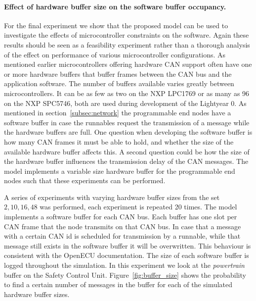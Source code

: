 \paragraph{Effect of hardware buffer size on the software buffer occupancy.} For the final experiment we show that the proposed model can be used to investigate the effects of microcontroller constraints on the software. Again these results should be seen as a feasibility experiment rather than a thorough analysis of the effect on performance of various microcontroller configurations. As mentioned earlier microcontrollers offering hardware CAN support often have one or more hardware buffers that buffer frames between the CAN bus and the application software. The number of buffers available varies greatly between microcontrollers. It can be as few as two on the NXP LPC1769 or as many as 96 on the NXP SPC5746, both are used during development of the Lightyear 0. As mentioned in section~\ref{subsec:network} the programmable end nodes have a software buffer in case the runnables request the transmission of a message while the hardware buffers are full. One question when developing the software buffer is how many CAN frames it must be able to hold, and whether the size of the available hardware buffer affects this. A second question could be how the size of the hardware buffer influences the transmission delay of the CAN messages. The model implements a variable size hardware buffer for the programmable end nodes such that these experiments can be performed. 

A series of experiments with varying hardware buffer sizes from the set ${2,10,16,48}$ was performed, each experiment is repeated 20 times. The model implements a software buffer for each CAN bus. Each buffer has one slot per CAN frame that the node transmits on that CAN bus. In case that a message with a certain CAN id is scheduled for transmission by a runnable, while that message still exists in the software buffer it will be overwritten. This behaviour is consistent with the OpenECU documentation. The size of each software buffer is logged throughout the simulation. In this experiment we look at the \textit{powertrain} buffer on the Safety Control Unit. Figure~\ref{fig:buffer_size} shows the probability to find a certain number of messages in the buffer for each of the simulated hardware buffer sizes.

